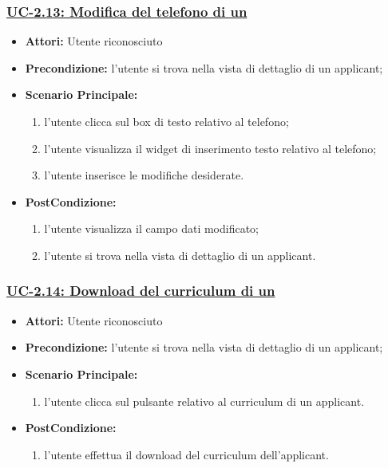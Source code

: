 \subsubsection{\underline{UC-2.13: Modifica del telefono di un \applicant}}
\begin{itemize}
	\item \textbf{Attori:} Utente riconosciuto
	\item \textbf{Precondizione:}  l'utente si trova nella vista di dettaglio di un applicant;
	\item \textbf{Scenario Principale:}
	\begin{enumerate}
		\item l'utente clicca sul box di testo relativo al telefono;
		\item l'utente visualizza il  widget di inserimento testo relativo al telefono;
		\item l'utente inserisce le modifiche desiderate.
	\end{enumerate}
	\item \textbf{PostCondizione:} 
	\begin{enumerate}
		\item l'utente visualizza il campo dati modificato;
		\item l'utente si trova nella vista di dettaglio di un applicant.
	\end{enumerate}
	
\end{itemize}


\subsubsection{\underline{UC-2.14: Download del curriculum di un \applicant}}
\begin{itemize}
	\item \textbf{Attori:} Utente riconosciuto
	\item \textbf{Precondizione:}  l'utente si trova nella vista di dettaglio di un applicant;
	\item \textbf{Scenario Principale:}
	\begin{enumerate}
		\item l'utente clicca sul pulsante relativo al curriculum di un applicant.
	\end{enumerate}
	\item \textbf{PostCondizione:} 
	\begin{enumerate}
		\item l'utente effettua il download del curriculum dell'applicant.
	\end{enumerate}
	
\end{itemize}

